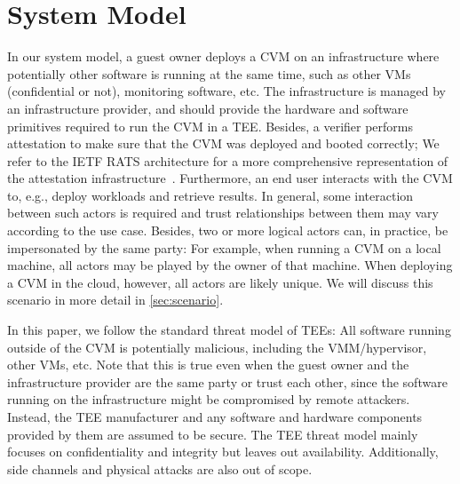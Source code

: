 \section{System Model}

In our system model, a guest owner deploys a \ac{CVM} on an infrastructure where
potentially other software is running at the same time, such as other VMs
(confidential or not), monitoring software, etc. The infrastructure is managed
by an infrastructure provider, and should provide the hardware and software
primitives required to run the \ac{CVM} in a \ac{TEE}. Besides, a verifier
performs attestation to make sure that the \ac{CVM} was deployed and booted
correctly; We refer to the IETF RATS architecture for a more comprehensive
representation of the attestation infrastructure~\cite{ietfRats}. Furthermore,
an end user interacts with the \ac{CVM} to, e.g., deploy workloads and retrieve
results. In general, some interaction between such actors is required and trust
relationships between them may vary according to the use case. Besides, two or
more logical actors can, in practice, be impersonated by the same party: For
example, when running a \ac{CVM} on a local machine, all actors may be played by
the owner of that machine. When deploying a \ac{CVM} in the cloud, however, all
actors are likely unique. We will discuss this scenario in more detail in
\cref{sec:scenario}.

In this paper, we follow the standard threat model of \acp{TEE}: All software
running outside of the \ac{CVM} is potentially malicious, including the
VMM/hypervisor, other VMs, etc. Note that this is true even when the guest owner
and the infrastructure provider are the same party or trust each other, since
the software running on the infrastructure might be compromised by remote
attackers. Instead, the \ac{TEE} manufacturer and any software and hardware
components provided by them are assumed to be secure. The \ac{TEE} threat model
mainly focuses on confidentiality and integrity but leaves out availability.
Additionally, side channels and physical attacks are also out of scope.

